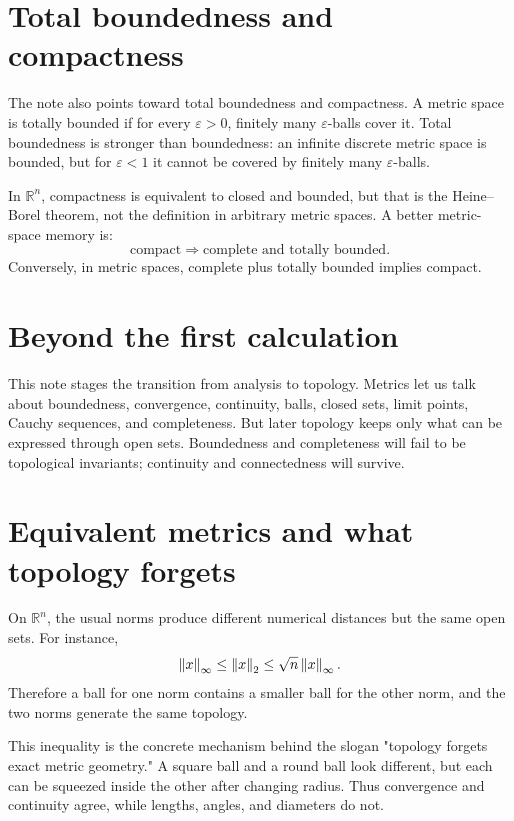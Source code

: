 \section{Total boundedness and compactness}

The note also points toward total boundedness and compactness.  A metric space is totally bounded if for every $\varepsilon>0$, finitely many $\varepsilon$-balls cover it.  Total boundedness is stronger than boundedness: an infinite discrete metric space is bounded, but for $\varepsilon<1$ it cannot be covered by finitely many $\varepsilon$-balls.

In $\mathbb R^n$, compactness is equivalent to closed and bounded, but that is the Heine--Borel theorem, not the definition in arbitrary metric spaces.  A better metric-space memory is:
\[
  \text{compact} \Rightarrow \text{complete and totally bounded}.
\]
Conversely, in metric spaces, complete plus totally bounded implies compact.

\section{Beyond the first calculation}

This note stages the transition from analysis to topology.  Metrics let us talk about boundedness, convergence, continuity, balls, closed sets, limit points, Cauchy sequences, and completeness.  But later topology keeps only what can be expressed through open sets.  Boundedness and completeness will fail to be topological invariants; continuity and connectedness will survive.

\section{Equivalent metrics and what topology forgets}

On \(\mathbb R^n\), the usual norms produce different numerical distances but the same open sets.  For instance,
\[
  \left\lVert x \right\rVert_\infty \le \left\lVert x \right\rVert_2 \le \sqrt n\left\lVert x \right\rVert_\infty.
\]
Therefore a ball for one norm contains a smaller ball for the other norm, and the two norms generate the same topology.

This inequality is the concrete mechanism behind the slogan "topology forgets exact metric geometry."  A square ball and a round ball look different, but each can be squeezed inside the other after changing radius.  Thus convergence and continuity agree, while lengths, angles, and diameters do not.

